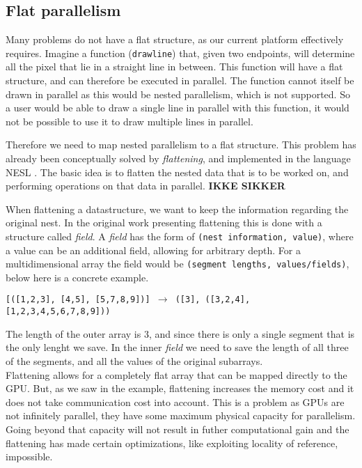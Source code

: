 \subsection{Flat parallelism}
Many problems do not have a flat structure, as our current platform
effectively requires. Imagine a function (\texttt{drawline}) that, given two
endpoints, will determine all the pixel that lie in a straight line in between.
This function will have a flat structure, and can therefore be executed
in parallel. The function cannot itself be drawn in parallel as this would be
nested parallelism, which is not supported. So a user would be able to draw a
single line in parallel with this function, it would not be possible to use it
to draw multiple lines in parallel.

Therefore we need to map nested parallelism to a flat structure. This problem
has already been conceptually solved by \textit{flattening}, and implemented in
the language NESL \cite{nesl}. The basic idea is to flatten the nested data
that is to be worked on, and performing operations on that data in parallel. 
\textbf{IKKE SIKKER}

When flattening a datastructure, we want to keep the information regarding the
original nest. In the original work presenting flattening \cite{flat} this is done
with a structure called \textit{field}. A \textit{field} has the form of \texttt{(nest
information, value)}, where a value can be an additional field, allowing for
arbitrary depth. For a multidimensional array the field would be
\texttt{(segment lengths, values/fields)}, below here is a concrete example. 
\begin{center}
  \texttt{[([1,2,3], [4,5], [5,7,8,9])] $\to$ ([3], ([3,2,4],
[1,2,3,4,5,6,7,8,9]))}
\end{center}
The length of the outer array is 3, and since there is only a single segment
that is the only lenght we save. In the inner \textit{field} we need to save
the length of all three of the segments, and all the values of the original
subarrays.\\

Flattening allows for a completely flat array that can be mapped directly to the
GPU. But, as we saw in the example, flattening increases the memory cost and
it does not take communication cost into account. This is a problem as GPUs are not
infinitely parallel, they have some maximum physical capacity for parallelism.
Going beyond that capacity will not result in futher computational gain and the
flattening has made certain optimizations, like exploiting locality of reference,
impossible.

